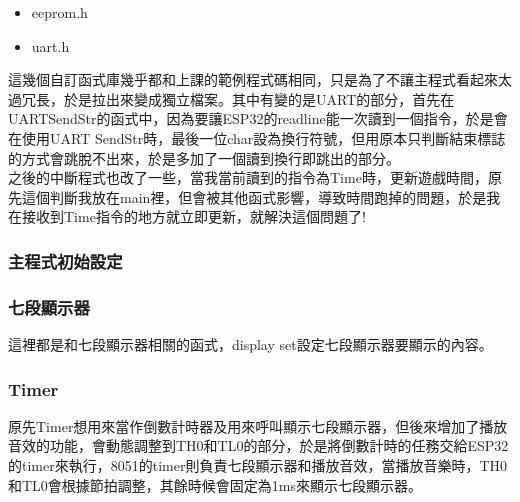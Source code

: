 \documentclass{scrartcl}
\begin{document}
\begin{itemize}
\item eeprom.h
\end{itemize}



\begin{itemize}
\item uart.h
\end{itemize}



這幾個自訂函式庫幾乎都和上課的範例程式碼相同，只是為了不讓主程式看起來太過冗長，於是拉出來變成獨立檔案。其中有變的是UART的部分，首先在UARTSendStr的函式中，因為要讓ESP32的readline能一次讀到一個指令，於是會在使用UART SendStr時，最後一位char設為換行符號，但用原本只判斷結束標誌的方式會跳脫不出來，於是多加了一個讀到換行即跳出的部分。\\
之後的中斷程式也改了一些，當我當前讀到的指令為Time時，更新遊戲時間，原先這個判斷我放在main裡，但會被其他函式影響，導致時間跑掉的問題，於是我在接收到Time指令的地方就立即更新，就解決這個問題了!

\subsubsection{主程式初始設定}


\subsubsection{七段顯示器}


這裡都是和七段顯示器相關的函式，display set設定七段顯示器要顯示的內容。

\subsubsection{Timer}


原先Timer想用來當作倒數計時器及用來呼叫顯示七段顯示器，但後來增加了播放音效的功能，會動態調整到TH0和TL0的部分，於是將倒數計時的任務交給ESP32的timer來執行，8051的timer則負責七段顯示器和播放音效，當播放音樂時，TH0和TL0會根據節拍調整，其餘時候會固定為1ms來顯示七段顯示器。
\end{document}
